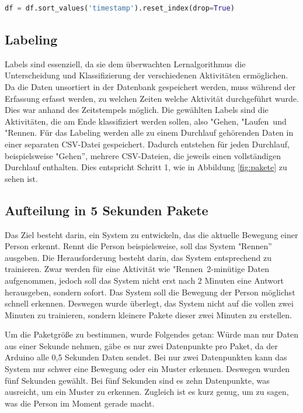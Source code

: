 \begin{lstlisting}[language=Python]
	df = df.sort_values('timestamp').reset_index(drop=True)
\end{lstlisting}

\subsection{Labeling}
Labels sind essenziell, da sie dem überwachten Lernalgorithmus die Unterscheidung und Klassifizierung der verschiedenen Aktivitäten ermöglichen. Da die Daten unsortiert in der Datenbank gespeichert werden, muss während der Erfassung erfasst werden, zu welchen Zeiten welche Aktivität durchgeführt wurde. Dies war anhand des Zeitstempels möglich. Die gewählten Labels sind die Aktivitäten, die am Ende klassifiziert werden sollen, also "Gehen\dq, "Laufen\dq\, und "Rennen\dq. Für das Labeling werden alle zu einem Durchlauf gehörenden Daten in einer separaten \ac{CSV}-Datei gespeichert. Dadurch entstehen für jeden Durchlauf, beispielsweise "Gehen”, mehrere CSV-Dateien, die jeweils einen vollständigen Durchlauf enthalten. Dies entspricht Schritt 1, wie in Abbildung \ref{fig:pakete} zu sehen ist.

\subsection{Aufteilung in 5 Sekunden Pakete}
Das Ziel besteht darin, ein System zu entwickeln, das die aktuelle Bewegung einer Person erkennt. Rennt die Person beispielsweise, soll das System "Rennen” ausgeben. Die Herausforderung besteht darin, das System entsprechend zu trainieren. Zwar werden für eine Aktivität wie "Rennen\dq\, 2-minütige Daten aufgenommen, jedoch soll das System nicht erst nach 2 Minuten eine Antwort herausgeben, sondern sofort. Das System soll die Bewegung der Person möglichst schnell erkennen. Deswegen wurde überlegt, das System nicht auf die vollen zwei Minuten zu trainieren, sondern kleinere Pakete dieser zwei Minuten zu erstellen. 

Um die Paketgröße zu bestimmen, wurde Folgendes getan: Würde man nur Daten aus einer Sekunde nehmen, gäbe es nur zwei Datenpunkte pro Paket, da der Arduino alle 0,5 Sekunden Daten sendet.  Bei nur zwei Datenpunkten kann das System nur schwer eine Bewegung oder ein Muster erkennen. Deswegen wurden fünf Sekunden gewählt. Bei fünf Sekunden sind es zehn Datenpunkte, was ausreicht, um ein Muster zu erkennen. Zugleich ist es kurz genug, um zu sagen, was die Person im Moment gerade macht.

